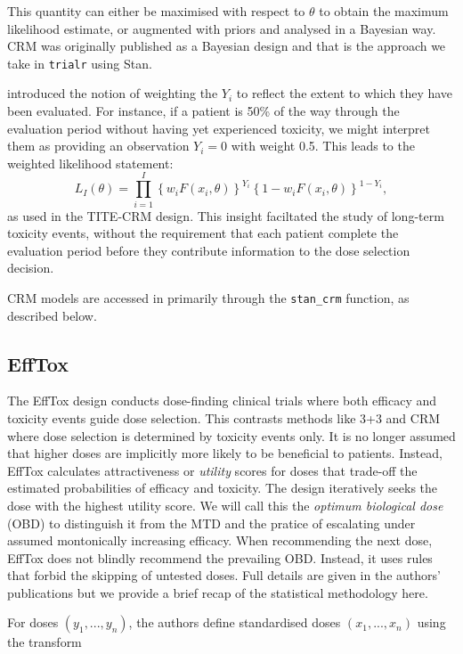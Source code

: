 \documentclass[article]{jss}
\begin{document}
This quantity can either be maximised with respect to \(\theta\) to
obtain the maximum likelihood estimate, or augmented with priors and
analysed in a Bayesian way. CRM was originally published as a Bayesian
design and that is the approach we take in \texttt{trialr} using Stan.

\citet{Cheung2000} introduced the notion of weighting the \(Y_i\) to
reflect the extent to which they have been evaluated. For instance, if a
patient is 50\% of the way through the evaluation period without having
yet experienced toxicity, we might interpret them as providing an
observation \(Y_i = 0\) with weight 0.5. This leads to the weighted
likelihood statement:
\[ L_I(\theta) = \prod_{i=1}^I \left\{ w_i F(x_i, \theta) \right\}^{Y_i} \left\{ 1 - w_i F(x_i, \theta) \right\}^{1-Y_i}, \]
as used in the TITE-CRM design. This insight faciltated the study of
long-term toxicity events, without the requirement that each patient
complete the evaluation period before they contribute information to the
dose selection decision.

CRM models are accessed in  primarily through the
\texttt{stan\_crm} function, as described below.

\hypertarget{efftox}{%
\subsection{EffTox}\label{efftox}}

The EffTox design \citep{Thall2004, Thall2006, Thall2014} conducts
dose-finding clinical trials where both efficacy and toxicity events
guide dose selection. This contrasts methods like 3+3 and CRM where dose
selection is determined by toxicity events only. It is no longer assumed
that higher doses are implicitly more likely to be beneficial to
patients. Instead, EffTox calculates attractiveness or \textit{utility}
scores for doses that trade-off the estimated probabilities of efficacy
and toxicity. The design iteratively seeks the dose with the highest
utility score. We will call this the \textit{optimum biological dose}
(OBD) to distinguish it from the MTD and the pratice of escalating under
assumed montonically increasing efficacy. When recommending the next
dose, EffTox does not blindly recommend the prevailing OBD. Instead, it
uses rules that forbid the skipping of untested doses. Full details are
given in the authors' publications but we provide a brief recap of the
statistical methodology here.

For doses \((y_1, ..., y_n)\), the authors define standardised doses
\((x_1, ..., x_n)\) using the transform
\end{document}

